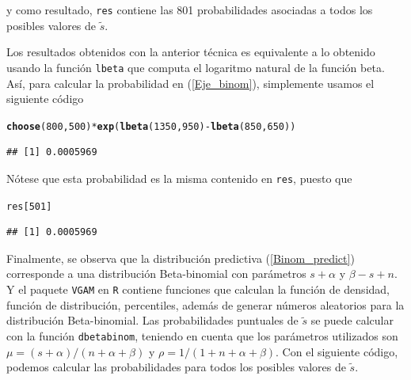 \documentclass[10pt,openright]{book}\usepackage[]{graphicx}\usepackage[]{color}
\makeatletter
\newcommand{\hlnum}[1]{\textcolor[rgb]{0.686,0.059,0.569}{#1}}%
\newcommand{\hlopt}[1]{\textcolor[rgb]{0,0,0}{#1}}%
\newcommand{\hlstd}[1]{\textcolor[rgb]{0.345,0.345,0.345}{#1}}%
\newcommand{\hlkwd}[1]{\textcolor[rgb]{0.737,0.353,0.396}{\textbf{#1}}}%
\newenvironment{kframe}{%
 \def\at@end@of@kframe{}%
 \ifinner\ifhmode%
  \def\at@end@of@kframe{\end{minipage}}%
  \begin{minipage}{\columnwidth}%
 \fi\fi%
 \def\FrameCommand##1{\hskip\@totalleftmargin \hskip-\fboxsep
 \colorbox{shadecolor}{##1}\hskip-\fboxsep
     \hskip-\linewidth \hskip-\@totalleftmargin \hskip\columnwidth}%
 \MakeFramed {\advance\hsize-\width
   \@totalleftmargin\z@ \linewidth\hsize
   \@setminipage}}%
 {\par\unskip\endMakeFramed%
 \at@end@of@kframe}
\newenvironment{knitrout}{}{} %
\makeatother
\begin{document}
    y como resultado, \verb"res" contiene las 801 probabilidades asociadas a todos los posibles valores de $\tilde{s}$.
    
    Los resultados obtenidos con la anterior t\'ecnica es equivalente a lo obtenido usando la funci\'on \verb"lbeta" que computa el logaritmo natural de la funci\'on beta. As\'i, para calcular la probabilidad en (\ref{Eje_binom}), simplemente usamos el siguiente c\'odigo 
    
\begin{knitrout}
\color{fgcolor}\begin{kframe}
\begin{alltt}
\hlkwd{choose}\hlstd{(}\hlnum{800}\hlstd{,}\hlnum{500}\hlstd{)}\hlopt{*}\hlkwd{exp}\hlstd{(}\hlkwd{lbeta}\hlstd{(}\hlnum{1350}\hlstd{,}\hlnum{950}\hlstd{)}\hlopt{-}\hlkwd{lbeta}\hlstd{(}\hlnum{850}\hlstd{,}\hlnum{650}\hlstd{))}
\end{alltt}
\begin{verbatim}
## [1] 0.0005969
\end{verbatim}
\end{kframe}
\end{knitrout}
    N\'otese que esta probabilidad es la misma contenido en \verb"res", puesto que
\begin{knitrout}
\color{fgcolor}\begin{kframe}
\begin{alltt}
\hlstd{res[}\hlnum{501}\hlstd{]}
\end{alltt}
\begin{verbatim}
## [1] 0.0005969
\end{verbatim}
\end{kframe}
\end{knitrout}
    Finalmente, se observa que la distribuci\'on predictiva (\ref{Binom_predict}) corresponde a una distribuci\'on Beta-binomial con par\'ametros $s+\alpha$ y $\beta-s+n$. Y el paquete \verb"VGAM" en \verb"R" \cite{VGAM} contiene funciones que calculan la funci\'on de densidad, funci\'on de distribuci\'on, percentiles, adem\'as de generar n\'umeros aleatorios para la distribuci\'on Beta-binomial. Las probabilidades puntuales de $\tilde{s}$ se puede calcular con la funci\'on \verb"dbetabinom", teniendo en cuenta que los par\'ametros utilizados son $\mu=(s+\alpha)/(n+\alpha+\beta)$ y $\rho=1/(1+n+\alpha+\beta)$. Con el siguiente c\'odigo, podemos calcular las probabilidades para todos los posibles valores de $\tilde{s}$.
    
\end{document}
